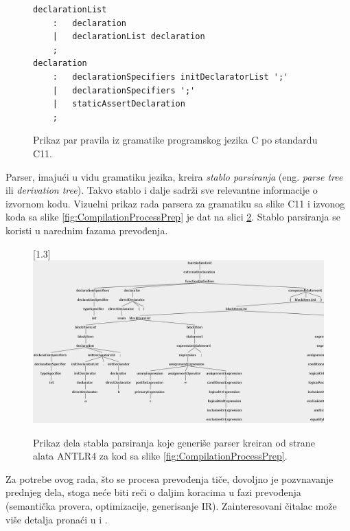 \begin{figure}[h!]
\begin{lstlisting}[language={}]
declarationList
    :   declaration
    |   declarationList declaration
    ;
declaration
    :   declarationSpecifiers initDeclaratorList ';'
    | 	declarationSpecifiers ';'
    |   staticAssertDeclaration
    ;
\end{lstlisting}
\caption{Prikaz par pravila iz gramatike programskog jezika C po standardu C11.}
\label{fig:CompilationProcessGram}
\end{figure}

Parser, imajući u vidu gramatiku jezika, kreira \emph{stablo parsiranja} (eng. \emph{parse tree} ili \emph{derivation tree}). Takvo stablo i dalje sadrži sve relevantne informacije o izvornom kodu. Vizuelni prikaz rada parsera za gramatiku sa slike C11 i izvonog koda sa slike \ref{fig:CompilationProcessPrep} je dat na slici \ref{fig:CompilationProcessPars}. Stablo parsiranja se koristi u narednim fazama prevođenja.

\begin{figure}[h!]
\centering
\scalebox{0.95}[1.3] {
    \includegraphics[width=\textwidth]{images/parse_tree.png}
}
\caption{Prikaz dela stabla parsiranja koje generiše parser kreiran od strane alata ANTLR4 \cite{ANTLR} za kod sa slike \ref{fig:CompilationProcessPrep}.}
\label{fig:CompilationProcessPars}
\end{figure}

Za potrebe ovog rada, što se procesa prevođenja tiče, dovoljno je pozvnavanje prednjeg dela, stoga neće biti reči o daljim koracima u fazi prevođenja (semantička provera, optimizacije, generisanje IR). Zainteresovani čitalac može više detalja pronaći u \cite{EngineeringCompilers} i \cite{CompilerConstruction}. 

